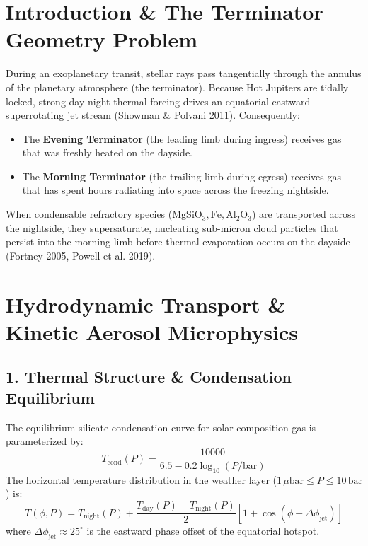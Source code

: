 \documentclass[11pt,a4paper]{article}
\begin{document}
\section{Introduction \& The Terminator Geometry Problem}
During an exoplanetary transit, stellar rays pass tangentially through the annulus of the planetary atmosphere (the terminator). Because Hot Jupiters are tidally locked, strong day-night thermal forcing drives an equatorial eastward superrotating jet stream (Showman \& Polvani 2011).
Consequently:
\begin{itemize}
    \item The \textbf{Evening Terminator} (the leading limb during ingress) receives gas that was freshly heated on the dayside.
    \item The \textbf{Morning Terminator} (the trailing limb during egress) receives gas that has spent hours radiating into space across the freezing nightside.
\end{itemize}
When condensable refractory species ($\mathrm{MgSiO_3}, \mathrm{Fe}, \mathrm{Al_2O_3}$) are transported across the nightside, they supersaturate, nucleating sub-micron cloud particles that persist into the morning limb before thermal evaporation occurs on the dayside (Fortney 2005, Powell et al. 2019).

\section{Hydrodynamic Transport \& Kinetic Aerosol Microphysics}

\subsection{1. Thermal Structure \& Condensation Equilibrium}
The equilibrium silicate condensation curve for solar composition gas is parameterized by:
\begin{equation}
T_{\text{cond}}(P) = \frac{10000}{6.5 - 0.2 \log_{10}(P / \text{bar})}
\end{equation}
The horizontal temperature distribution in the weather layer ($1\,\mu\mathrm{bar} \le P \le 10\,\mathrm{bar}$) is:
\begin{equation}
T(\phi, P) = T_{\text{night}}(P) + \frac{T_{\text{day}}(P) - T_{\text{night}}(P)}{2} \left[ 1 + \cos(\phi - \Delta\phi_{\text{jet}}) \right]
\end{equation}
where $\Delta\phi_{\text{jet}} \approx 25^\circ$ is the eastward phase offset of the equatorial hotspot.
\end{document}
